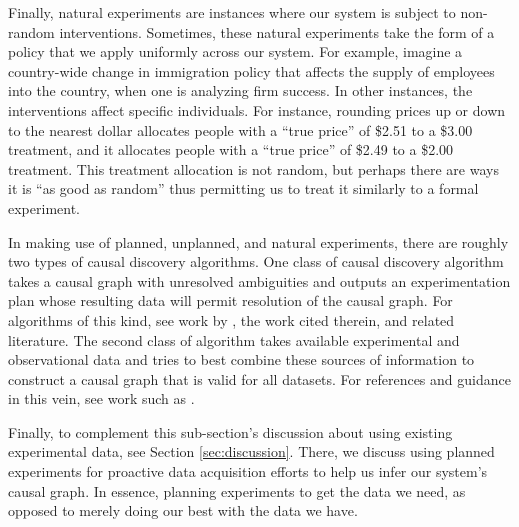 Finally, natural experiments are instances where our system is subject to non-random interventions.
Sometimes, these natural experiments take the form of a policy that we apply uniformly across our system.
For example, imagine a country-wide change in immigration policy that affects the supply of employees into the country, when one is analyzing firm success.
In other instances, the interventions affect specific individuals.
For instance, rounding prices up or down to the nearest dollar allocates people with a ``true price'' of \$2.51 to a \$3.00 treatment, and it allocates people with a ``true price'' of \$2.49 to a \$2.00 treatment.
This treatment allocation is not random, but perhaps there are ways it is ``as good as random'' thus permitting us to treat it similarly to a formal experiment.

In making use of planned, unplanned, and natural experiments, there are roughly two types of causal discovery algorithms.
One class of causal discovery algorithm takes a causal graph with unresolved ambiguities and outputs an experimentation plan whose resulting data will permit resolution of the causal graph.
For algorithms of this kind, see work by \citet{ghassami_2018_budgeted}, the work cited therein, and related literature.
The second class of algorithm takes available experimental and observational data and tries to best combine these sources of information to construct a causal graph that is valid for all datasets.
For references and guidance in this vein, see work such as \citet{tian_2013_causal, peters_2016_causal, ghassami_2017_learning, zhang_2017_causal, kallus_2018_removing}.

Finally, to complement this sub-section's discussion about using existing experimental data, see Section \ref{sec:discussion}.
There, we discuss using planned experiments for proactive data acquisition efforts to help us infer our system's causal graph.
In essence, planning experiments to get the data we need, as opposed to merely doing our best with the data we have.
